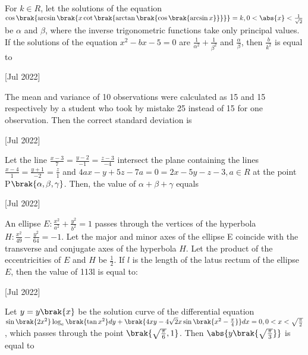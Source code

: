 \iffalse
	\title{2022}
	\author{AI24BTECH11003}
	\section{integer}
\fi

    \item For $k\in R$, let the solutions of the equation $\cos\brak{\arcsin\brak{x\cot\brak{\arctan\brak{\cos\brak{\arcsin x}}}}}=k,0<\abs{x}<\frac{1}{\sqrt{2}}$ be $\alpha$ and $\beta$, where the inverse trigonometric functions take only principal values. If the solutions of the equation $x^2-bx-5=0$ are $\frac{1}{\alpha^2}+\frac{1}{\beta^2}$ and $\frac{\alpha}{\beta}$, then $\frac{b}{k^2}$ is equal to
    
    \hfill[Jul 2022]

    \item The mean and variance of 10 observations were calculated as 15 and 15 respectively by a student who took by mistake 25 instead of 15 for one observation. Then the correct standard deviation is
    
    \hfill[Jul 2022]
		
    \item Let the line $\frac{x-3}{7}=\frac{y-2}{-1}=\frac{z-3}{-4}$ intersect the plane containing the lines $\frac{x-4}{1}=\frac{y+1}{-2}=\frac{z}{1}$ and $4ax-y+5z-7a=0=2x-5y-z-3,a\in R$ at the point P$\brak{\alpha,\beta,\gamma}$. Then, the value of $\alpha+\beta+\gamma$ equals
    
    \hfill[Jul 2022]

    \item An ellipse $E:\frac{x^2}{a^2}+\frac{y^2}{b^2}=1$ passes through the vertices of the hyperbola $H:\frac{x^2}{49}-\frac{y^2}{64}=-1$. Let the major and minor axes of the ellipse E coincide with the transverse and conjugate axes of the hyperbola $H$. Let the product of the eccentricities of $E$ and $H$ be $\frac{1}{2}$. If $l$ is the length of the latus rectum of the ellipse $E$, then the value of 113l is equal to:
    
    \hfill[Jul 2022]

    \item Let $y=y\brak{x}$ be the solution curve of the differential equation $\sin\brak{2x^2}\log_e\brak{\tan x^2}dy+\brak{4xy-4\sqrt{2}x\sin\brak{x^2-\frac{\pi}{4}}}dx=0, 0<x<\sqrt{\frac{\pi}{2}}$, which passes through the point $\brak{\sqrt{\frac{\pi}{6}},1}$. Then $\abs{y\brak{\sqrt{\frac{\pi}{3}}}}$ is equal to
    
